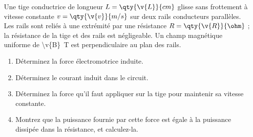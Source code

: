 Une tige conductrice de longueur $L = \qty{\v{L}}{cm}$ glisse sans frottement à vitesse constante $v = \qty{\v{v}}{m/s}$ sur deux rails conducteurs parallèles. Les rails sont reliés à une extrémité par une résistance $R = \qty{\v{R}}{\ohm}$ ; la résistance de la tige et des rails est négligeable. Un champ magnétique uniforme de \qty{\v{B}}{T} est perpendiculaire au plan des rails.

\begin{center}
\end{center}

\begin{enumerate}[label=\alph*)]
    \item Déterminez la force électromotrice induite.
    \item Déterminez le courant induit dans le circuit.
    \item Déterminez la force qu'il faut appliquer sur la tige pour maintenir sa vitesse constante.
    \item Montrez que la puissance fournie par cette force est égale à la puissance dissipée dans la résistance, et calculez-la.
\end{enumerate}
